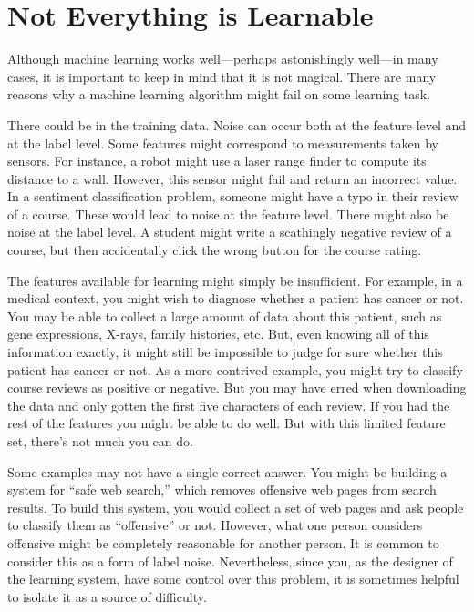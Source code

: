 \section{Not Everything is Learnable}

Although machine learning works well---perhaps astonishingly well---in
many cases, it is important to keep in mind that it is not magical.
There are many reasons why a machine learning algorithm might fail on
some learning task.

There could be  in the training data.  Noise can occur
both at the feature level and at the label level.  Some features might
correspond to measurements taken by sensors.  For instance, a robot
might use a laser range finder to compute its distance to a wall.
However, this sensor might fail and return an incorrect value.  In a
sentiment classification problem, someone might have a typo in their
review of a course.  These would lead to noise at the feature level.
There might also be noise at the label level.  A student might write a
scathingly negative review of a course, but then accidentally click
the wrong button for the course rating.

The features available for learning might simply be insufficient.  For
example, in a medical context, you might wish to diagnose whether a
patient has cancer or not.  You may be able to collect a large amount
of data about this patient, such as gene expressions, X-rays, family
histories, etc.  But, even knowing all of this information exactly, it
might still be impossible to judge for sure whether this patient has
cancer or not.  As a more contrived example, you might try to classify
course reviews as positive or negative.  But you may have erred when
downloading the data and only gotten the first five characters of each
review.  If you had the rest of the features you might be able to do
well.  But with this limited feature set, there's not much you can do.

Some examples may not have a single correct answer.  You might be
building a system for ``safe web search,'' which removes offensive web
pages from search results.  To build this system, you would collect a
set of web pages and ask people to classify them as ``offensive'' or
not.  However, what one person considers offensive might be completely
reasonable for another person.  It is common to consider this as a
form of label noise.  Nevertheless, since you, as the designer of the
learning system, have some control over this problem, it is sometimes
helpful to isolate it as a source of difficulty.

